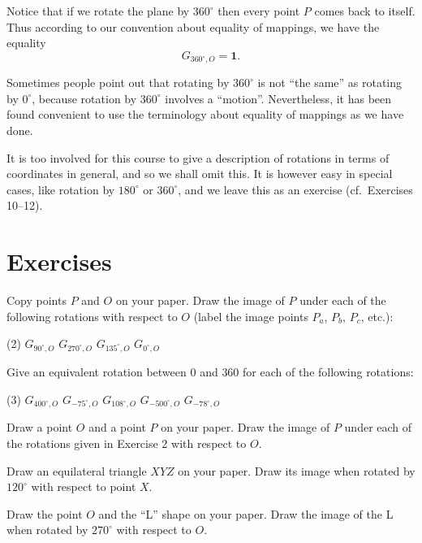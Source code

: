 \documentclass[12pt]{book} %
\begin{document}
\begin{ExerciseList}
Notice that if we rotate the plane by $360^\circ$ then every point $P$ comes
back to itself. Thus according to our convention about equality of mappings, we have the equality
\[
G_{360^\circ,O}=\mathbf{1}.
\]

Sometimes people point out that rotating by $360^\circ$ is not ``the same'' as
rotating by $0^\circ$, because rotation by $360^\circ$ involves a ``motion''. Nevertheless, it has been found convenient to use the terminology about equality of mappings as we have done.

It is too involved for this course to give a description of rotations in
terms of coordinates in general, and so we shall omit this. It is however
easy in special cases, like rotation by $180^\circ$ or $360^\circ$, and we leave this as
an exercise (cf.\ Exercises 10--12).

\section*{Exercises}

\setcounter{Exercise}{0}
\begin{ExerciseList}
\Exercise Copy points $P$ and $O$ on your paper. Draw the image of $P$ under each of
the following rotations with respect to $O$ (label the image points $P_a$, $P_b$, $P_c$,
etc.):
\begin{tasks}(2)
\task[(a)] $G_{90^\circ,O}$
\task[(b)] $G_{270^\circ,O}$
\task[(c)] $G_{135^\circ,O}$
\task[(d)] $G_{0^\circ,O}$
\end{tasks}


\Exercise Give an equivalent rotation between $0$ and $360$ for each of the following
rotations:
\begin{tasks}(3)
\task[(a)] $G_{400^\circ,O}$
\task[(b)] $G_{-75^\circ,O}$
\task[(c)] $G_{108^\circ,O}$
\task[(d)] $G_{-500^\circ,O}$
\task[(e)] $G_{-78^\circ,O}$
\end{tasks}

\Exercise Draw a point $O$ and a point $P$ on your paper. Draw the image of $P$ under
each of the rotations given in Exercise 2 with respect to $O$.

\Exercise Draw an equilateral triangle $XYZ$ on your paper. Draw its image when
rotated by $120^\circ$ with respect to point $X$.

\Exercise Draw the point $O$ and the ``L'' shape on your paper. Draw the image of the
L when rotated by $270^\circ$ with respect to $O$.


\end{ExerciseList}
\end{ExerciseList}
\end{document}
